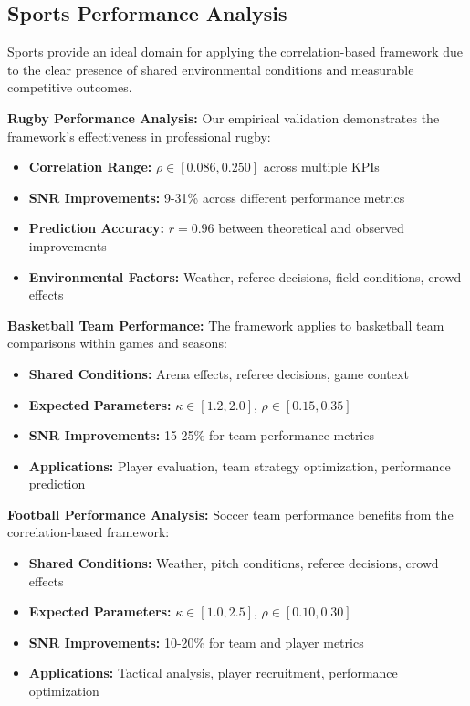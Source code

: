 \subsection{Sports Performance Analysis}

Sports provide an ideal domain for applying the correlation-based framework due to the clear presence of shared environmental conditions and measurable competitive outcomes.

\textbf{Rugby Performance Analysis:}
Our empirical validation demonstrates the framework's effectiveness in professional rugby:
\begin{itemize}
    \item \textbf{Correlation Range:} $\rho \in [0.086, 0.250]$ across multiple KPIs
    \item \textbf{SNR Improvements:} 9-31\% across different performance metrics
    \item \textbf{Prediction Accuracy:} $r = 0.96$ between theoretical and observed improvements
    \item \textbf{Environmental Factors:} Weather, referee decisions, field conditions, crowd effects
\end{itemize}

\textbf{Basketball Team Performance:}
The framework applies to basketball team comparisons within games and seasons:
\begin{itemize}
    \item \textbf{Shared Conditions:} Arena effects, referee decisions, game context
    \item \textbf{Expected Parameters:} $\kappa \in [1.2, 2.0]$, $\rho \in [0.15, 0.35]$
    \item \textbf{SNR Improvements:} 15-25\% for team performance metrics
    \item \textbf{Applications:} Player evaluation, team strategy optimization, performance prediction
\end{itemize}

\textbf{Football Performance Analysis:}
Soccer team performance benefits from the correlation-based framework:
\begin{itemize}
    \item \textbf{Shared Conditions:} Weather, pitch conditions, referee decisions, crowd effects
    \item \textbf{Expected Parameters:} $\kappa \in [1.0, 2.5]$, $\rho \in [0.10, 0.30]$
    \item \textbf{SNR Improvements:} 10-20\% for team and player metrics
    \item \textbf{Applications:} Tactical analysis, player recruitment, performance optimization
\end{itemize}

